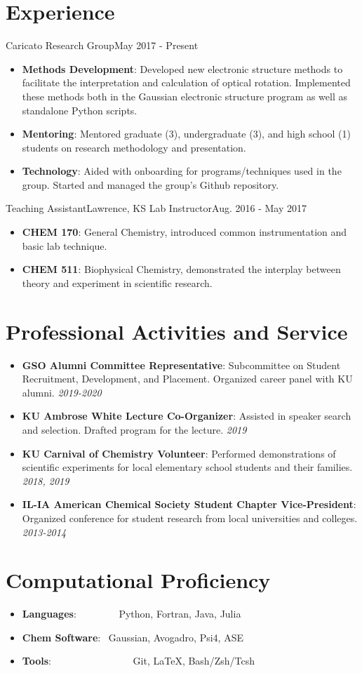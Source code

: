 \documentclass[a4paper,11pt]{article}
\newcommand{\resumeItem}[2]{
  \item\small{
    \textbf{#1}{: #2 \vspace{-2pt}}
  }
}
\newcommand{\resumeSubItem}[2]{\resumeItem{#1}{#2}\vspace{-3pt}}
\newcommand{\resumeSubHeadingListStart}{\begin{itemize}[leftmargin=*]}
\newcommand{\resumeSubHeadingListEnd}{\end{itemize}}
\newcommand{\resumeItemListStart}{\begin{itemize}}
\newcommand{\resumeItemListEnd}{\end{itemize}\vspace{-5pt}}
\begin{document}
\vspace{-5pt}
\section{Experience}
  \resumeSubHeadingListStart
    {Caricato Research Group}{May 2017 - Present}
    \resumeItemListStart
        \resumeItem{Methods Development}
          {Developed new electronic structure methods to facilitate the interpretation and calculation of optical rotation. Implemented these methods both in the Gaussian electronic structure program as well as standalone Python scripts.}
          \resumeItem{Mentoring}
          {Mentored graduate (3), undergraduate (3), and high school (1) students on research methodology and presentation.}
          \resumeItem{Technology}
          {Aided with onboarding for programs/techniques used in the group. Started and managed the group's Github repository.}
      \resumeItemListEnd
    \resumeSubheading
		{Teaching Assistant}{Lawrence, KS}
		{Lab Instructor}{Aug. 2016 - May 2017}
		\resumeItemListStart
        \resumeItem{CHEM 170}
          {General Chemistry, introduced common instrumentation and basic lab technique.}
        \resumeItem{CHEM 511}
          {Biophysical Chemistry, demonstrated the interplay between theory and experiment in scientific research.}
		\resumeItemListEnd

\resumeSubHeadingListEnd


\vspace{-5pt}
\section{Professional Activities and Service}
  \resumeSubHeadingListStart
	\resumeSubItem{GSO Alumni Committee Representative}
    {Subcommittee on Student Recruitment, Development, and Placement. Organized career panel with KU alumni. \textit{2019-2020}}
    \resumeSubItem{KU Ambrose White Lecture Co-Organizer}
    {Assisted in speaker search and selection. Drafted program for the lecture. \textit{2019}}
    \resumeSubItem{KU Carnival of Chemistry Volunteer}
    {Performed demonstrations of scientific experiments for local elementary school students and their families. \textit{2018, 2019}}
    \resumeSubItem{IL-IA American Chemical Society Student Chapter Vice-President}{Organized conference for student research from local universities and colleges. \textit{2013-2014}} 

\resumeSubHeadingListEnd

\vspace{-5pt}
\section{Computational Proficiency}
	\resumeSubHeadingListStart
	\resumeSubItem{Languages}{~~~~~~~~Python, Fortran, Java, Julia}
	\resumeSubItem{Chem Software}{~Gaussian, Avogadro, Psi4, ASE}
	\resumeSubItem{Tools}{~~~~~~~~~~~~~~~~Git, LaTeX, Bash/Zsh/Tcsh}
    \resumeSubHeadingListEnd
\end{document}
